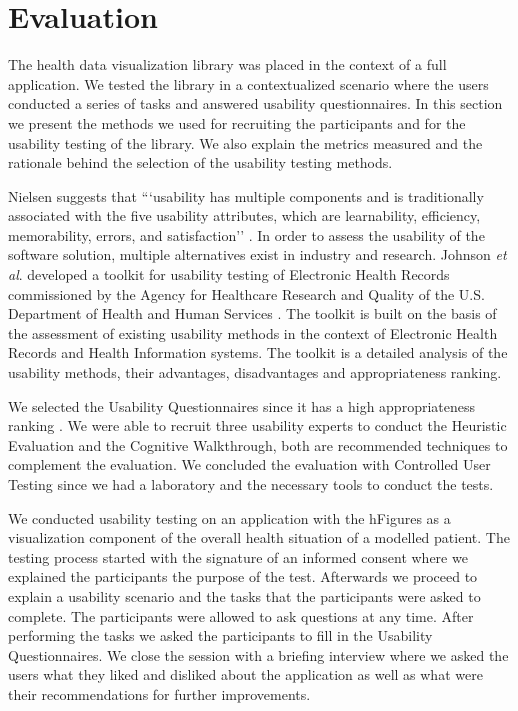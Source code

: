 \documentclass[twocolumn]{bmcart}%
\begin{document}
\section*{Evaluation}

The health data visualization library was placed in the context of a full application. We tested the library in a contextualized scenario where the users conducted a series of tasks and answered usability questionnaires. In this section we present the methods we used for recruiting the participants and for the usability testing of the library. We also explain the metrics measured and the rationale behind the selection of the usability testing methods.

Nielsen suggests that ```usability has multiple components and is traditionally associated with the five usability attributes, which are learnability, efficiency, memorability, errors, and satisfaction'' \cite{nielsen1994usability}. In order to assess the usability of the software solution, multiple alternatives exist in industry and research. Johnson \textit{et al}. developed a toolkit for usability testing of Electronic Health Records commissioned by the Agency for Healthcare Research and Quality of the U.S. Department of Health and Human Services \cite{johnson2011ehr}. The toolkit is built on the basis of the assessment of existing usability methods in the context of Electronic Health Records and Health Information systems. The toolkit is a detailed analysis of the usability methods, their advantages, disadvantages and appropriateness ranking.

We selected the Usability Questionnaires since it has a high appropriateness ranking \cite{johnson2011ehr}. We were able to recruit three usability experts to conduct the Heuristic Evaluation and the Cognitive Walkthrough, both are recommended techniques to complement the evaluation. We concluded the evaluation with Controlled User Testing since we had a laboratory and the necessary tools to conduct the tests.

We conducted usability testing on an application with the hFigures as a visualization component of the overall health situation of a modelled patient. The testing process started with the signature of an informed consent where we explained the participants the purpose of the test. Afterwards we proceed to explain a usability scenario and the tasks that the participants were asked to complete. The participants were allowed to ask questions at any time. After performing the tasks we asked the participants to fill in the Usability Questionnaires. We close the session with a briefing interview where we asked the users what they liked and disliked about the application as well as what were their recommendations for further improvements.
\end{document}

